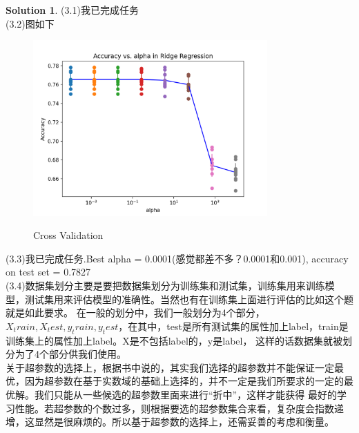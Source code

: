 \documentclass[a4paper,UTF8]{article}
\numberwithin{equation}{section}
\theoremstyle{definition}
\newtheorem*{solution}{Solution}
\begin{document}
\begin{solution}
    (3.1)我已完成任务\\
    (3.2)图如下\\
    \begin{figure}[H]
        \centering
        \includegraphics[width=0.8\textwidth]{cross_validation.png}\\
        \caption{Cross Validation}
        \label{fig:cv}
    \end{figure}
    (3.3)我已完成任务.Best alpha = 0.0001(感觉都差不多？0.0001和0.001), accuracy on test set = 0.7827\\
    (3.4)数据集划分主要是要把数据集划分为训练集和测试集，训练集用来训练模型，测试集用来评估模型的准确性。当然也有在训练集上面进行评估的比如这个题就是如此要求。
    在一般的划分中，我们一般划分为4个部分，$X_train,X_test,y_train,y_test$，在其中，test是所有测试集的属性加上label，train是训练集上的属性加上label。X是不包括label的，y是label，
    这样的话数据集就被划分为了4个部分供我们使用。\\
    关于超参数的选择上，根据书中说的，其实我们选择的超参数并不能保证一定最优，因为超参数在基于实数域的基础上选择的，并不一定是我们所要求的一定的最优解。我们只能从一些候选的超参数里面来进行“折中”，这样才能获得
    最好的学习性能。若超参数的个数过多，则根据要选的超参数集合来看，复杂度会指数递增，这显然是很麻烦的。所以基于超参数的选择上，还需妥善的考虑和衡量。
\end{solution}


\newpage
\end{document}
